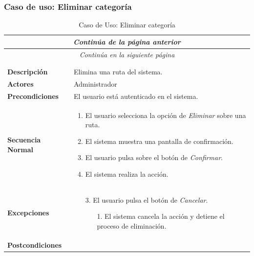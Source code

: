 


\newpage
\subsubsection*{Caso de uso: Eliminar categoría }
\begin{longtable}{| p{4cm} | p{10cm} |}
\endfirsthead
\multicolumn{2}{c}{\textit{Continúa de la página anterior}}\\[12pt]
\hline
\endhead
\hline
\multicolumn{2}{c}{\textit{Continúa en la siguiente página}} \\
\endfoot
\hline
\caption{Caso de Uso: Eliminar categoría}\label{fig:1}\\
\endlastfoot


\hline
\multicolumn{2}{|c|}{\textbf{CU$<$44$>$ - Eliminar Categoría}} \\

\hline
\textbf{Descripción} &
Elimina una ruta del sistema.\\

\hline
\textbf{Actores} &
Administrador\\

\hline
\textbf{Precondiciones} &
El usuario está autenticado en el sistema.\\

\hline
\textbf{Secuencia Normal} &\mbox{}\par\vspace{-\baselineskip}
\begin{enumerate}[leftmargin=0.7cm, topsep=0.1cm]
\item El usuario selecciona la opción de \textit{Eliminar} sobre una ruta.
\item El sistema muestra una pantalla de confirmación.
\item El usuario pulsa sobre el botón de \textit{Confirmar}.
\item El sistema realiza la acción.
\end{enumerate}


\\
\hline
\textbf{Excepciones} &\mbox{}\par\vspace{-\baselineskip}
\begin{enumerate}[leftmargin=0.9cm, topsep=0.1cm]
\item[3.] El usuario pulsa el botón de \textit{Cancelar}.
	\begin{itemize}
	\item[1.] El sistema cancela la acción y detiene el proceso de eliminación.
	\end{itemize}
\end{enumerate}
\\

\hline
\textbf{Postcondiciones} & \\
\hline
\end{longtable}